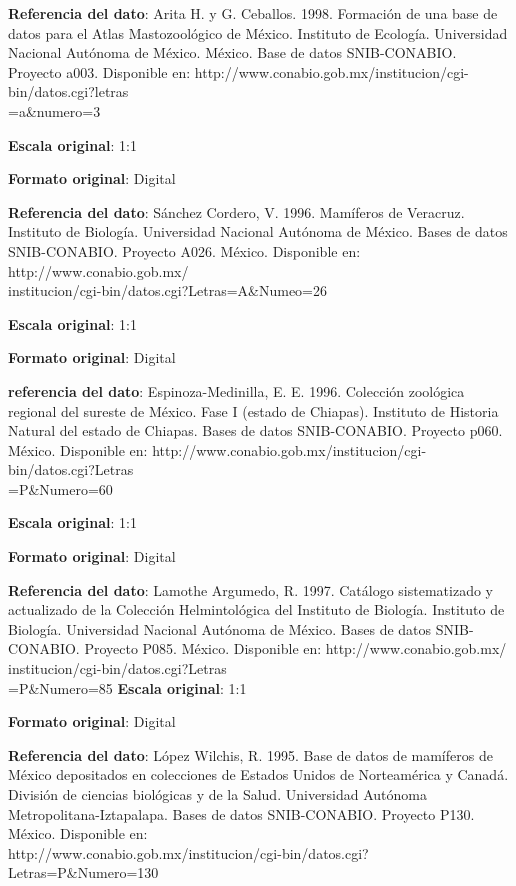 \documentclass[twoside]{book}
\begin{document}
{{\textbf{Referencia del dato}: Arita H. y G. Ceballos. 1998. Formación de una base de datos para el Atlas Mastozoológico de México. Instituto de Ecología. Universidad Nacional Autónoma de México. México. Base de datos SNIB-CONABIO. Proyecto a003. Disponible en: http://www.conabio.gob.mx/institucion/cgi-bin/datos.cgi?letras\\=a\&numero=3

\textbf{Escala original}: 1:1

\textbf{Formato original}: Digital

\textbf{Referencia del dato}: Sánchez Cordero, V. 1996. Mamíferos de Veracruz. Instituto de Biología. Universidad Nacional Autónoma de México. Bases de datos SNIB-CONABIO. Proyecto A026. México. Disponible en: http://www.conabio.gob.mx/\\institucion/cgi-bin/datos.cgi?Letras=A\&Numeo=26

\textbf{Escala original}: 1:1

\textbf{Formato original}: Digital

\textbf{referencia del dato}: Espinoza-Medinilla, E. E. 1996. Colección zoológica regional del sureste de México. Fase I (estado de Chiapas). Instituto de Historia Natural del estado de Chiapas. Bases de datos SNIB-CONABIO. Proyecto p060. México. Disponible en: http://www.conabio.gob.mx/institucion/cgi-bin/datos.cgi?Letras\\=P\&Numero=60

\textbf{Escala original}: 1:1

\textbf{Formato original}: Digital

\textbf{Referencia del dato}: Lamothe Argumedo, R. 1997. Catálogo sistematizado y actualizado de la Colección Helmintológica del Instituto de Biología. Instituto de Biología. Universidad Nacional Autónoma de México. Bases de datos SNIB-CONABIO. Proyecto P085. México. Disponible en: http://www.conabio.gob.mx/\\institucion/cgi-bin/datos.cgi?Letras\\=P\&Numero=85
\textbf{Escala original}: 1:1

\textbf{Formato original}: Digital

\textbf{Referencia del dato}: López Wilchis, R. 1995. Base de datos de mamíferos de México depositados en colecciones de Estados Unidos de Norteamérica y Canadá. División de ciencias biológicas y de la Salud. Universidad Autónoma Metropolitana-Iztapalapa. Bases de datos SNIB-CONABIO. Proyecto P130. México. Disponible en: \\http://www.conabio.gob.mx/institucion/cgi-bin/datos.cgi?\\Letras=P\&Numero=130

}}
\end{document}
